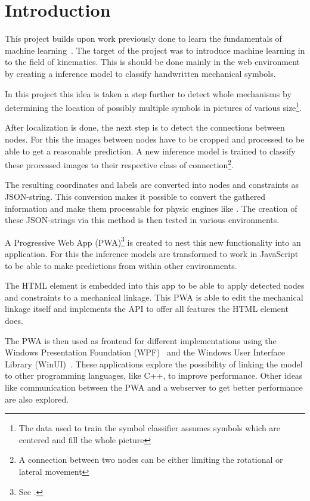 \section{Introduction}

This project builds upon work previously done to learn the fundamentals of machine learning~\cite{Lawrence2020}.
The target of the project was to introduce machine learning in to the field of kinematics.
This is should be done mainly in the web environment by creating a inference model to classify handwritten mechanical symbols.

In this project this idea is taken a step further to detect whole mechanisms by determining the location of possibly multiple symbols in pictures of various size\footnote{The data used to train the symbol classifier assumes symbols which are centered and fill the whole picture}.

After localization is done, the next step is to detect the connections between nodes.
For this the images between nodes have to be cropped and processed to be able to get a reasonable prediction.
A new inference model is trained to classify these processed images to their respective class of connection\footnote{A connection between two nodes can be either limiting the rotational or lateral movement}.

The resulting coordinates and labels are converted into  nodes and constraints as JSON-string.
This conversion makes it possible to convert the gathered information and make them processable for physic engines like .
The creation of these JSON-strings via this method is then tested in various environments.

A Progressive Web App (PWA)\footnote{See .} is created to nest this new functionality into an application.
For this the inference models are transformed to work in JavaScript to be able to make predictions from within other environments.

The  HTML element is embedded into this app to be able to apply detected nodes and constraints to a mechanical linkage.
This PWA is able to edit the mechanical linkage itself and implements the  API to offer all features the  HTML element does.

The PWA is then used as frontend for different implementations using the Windows Presentation Foundation (WPF)~\cite{Microsoft2021} and the Windows User Interface Library (WinUI)~\cite{Microsoft2021a}.
These applications explore the possibility of linking the model to other programming languages, like C++, to improve performance.
Other ideas like communication between the PWA and a webserver to get better performance are also explored.

